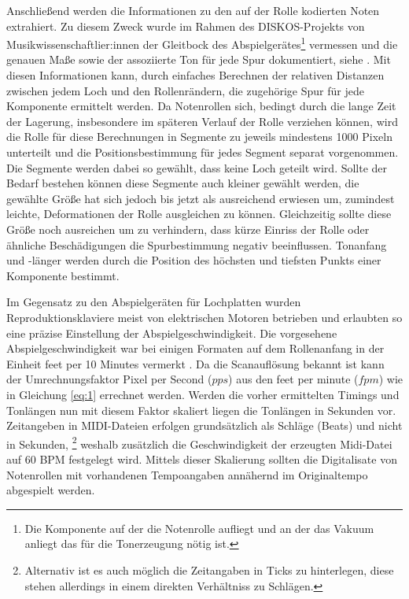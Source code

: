 Anschließend werden die Informationen zu den auf der Rolle kodierten Noten extrahiert.
Zu diesem Zweck wurde im Rahmen des DISKOS-Projekts von Musikwissenschaftlier:innen der Gleitbock des Abspielgerätes\footnote{Die Komponente auf der die Notenrolle aufliegt und an der das Vakuum anliegt das für die Tonerzeugung nötig ist.} vermessen und die genauen Maße sowie der assoziierte Ton für jede Spur dokumentiert, siehe \textcite[]{mxp_2002548}.
Mit diesen Informationen kann, durch einfaches Berechnen der relativen Distanzen zwischen jedem Loch und den Rollenrändern, die zugehörige Spur für jede Komponente ermittelt werden.
Da Notenrollen sich, bedingt durch die lange Zeit der Lagerung, insbesondere im späteren Verlauf der Rolle verziehen können, wird die Rolle für diese Berechnungen in Segmente zu jeweils mindestens 1000 Pixeln unterteilt und die Positionsbestimmung für jedes Segment separat vorgenommen.
Die Segmente werden dabei so gewählt, dass keine Loch geteilt wird.
Sollte der Bedarf bestehen können diese Segmente auch kleiner gewählt werden, die gewählte Größe hat sich jedoch bis jetzt als ausreichend erwiesen um, zumindest leichte, Deformationen der Rolle ausgleichen zu können.
Gleichzeitig sollte diese Größe noch ausreichen um zu verhindern, dass kürze Einriss der Rolle oder ähnliche Beschädigungen die Spurbestimmung negativ beeinflussen.
Tonanfang und -länger werden durch die Position des höchsten und tiefsten Punkts einer Komponente bestimmt.

Im Gegensatz zu den Abspielgeräten für Lochplatten wurden Reproduktionsklaviere meist von elektrischen Motoren betrieben und erlaubten so eine präzise Einstellung der Abspielgeschwindigkeit.
Die vorgesehene Abspielgeschwindigkeit war bei einigen Formaten auf dem Rollenanfang in der Einheit feet per 10 Minutes vermerkt \parencite[63]{colmenares_2011}.
Da die Scanauflösung bekannt ist kann der Umrechnungsfaktor Pixel per Second ($pps$) aus den feet per minute ($fpm$) wie in Gleichung \ref{eq:1} errechnet werden.
Werden die vorher ermittelten Timings und Tonlängen nun mit diesem Faktor skaliert liegen die Tonlängen in Sekunden vor.
Zeitangeben in MIDI-Dateien erfolgen grundsätzlich als Schläge (Beats) und nicht in Sekunden, \footnote{Alternativ ist es auch möglich die Zeitangaben in Ticks zu hinterlegen, diese stehen allerdings in einem direkten Verhältniss zu Schlägen.} weshalb zusätzlich die Geschwindigkeit der erzeugten Midi-Datei auf 60 BPM festgelegt wird.
Mittels dieser Skalierung sollten die Digitalisate von Notenrollen mit vorhandenen Tempoangaben annähernd im Originaltempo abgespielt werden.

